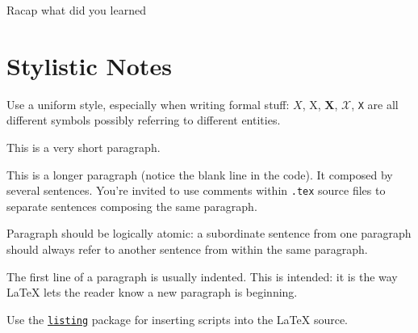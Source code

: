 \documentclass{scrartcl}
\begin{document}
    Racap what did you learned

    \section*{Stylistic Notes}

    Use a uniform style, especially when writing formal stuff: $X$, X, $\mathbf{X}$, $\mathcal{X}$, \texttt{X} are all different symbols possibly referring to different entities.

    This is a very short paragraph.

    This is a longer paragraph (notice the blank line in the code).
    It composed by several sentences.
%
    You're invited to use comments within \texttt{.tex} source files to separate sentences composing the same paragraph.

    Paragraph should be logically atomic: a subordinate sentence from one paragraph should always refer to another sentence from within the same paragraph.

    The first line of a paragraph is usually indented.
%
    This is intended: it is the way \LaTeX{} lets the reader know a new paragraph is beginning.

    Use the \href{https://en.wikibooks.org/wiki/LaTeX/Source_Code_Listings}{\texttt{listing}} package for inserting scripts into the \LaTeX{} source.

    \nocite{*} %
    
    
\end{document}
